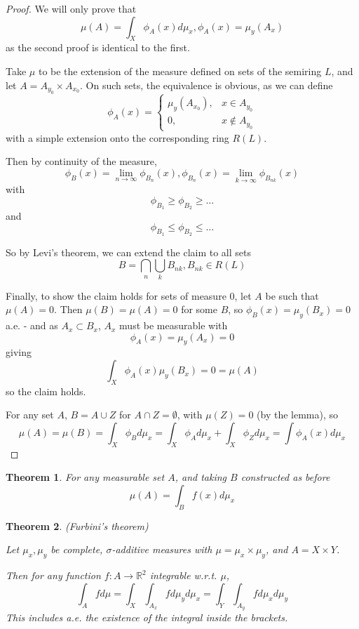 \documentclass[11pt,a4paper]{report}
\theoremstyle{plain}
\newtheorem{thm}{Theorem}[section]
\theoremstyle{definition}
\theoremstyle{remark}
\newcommand{\union}{\cup}
\newcommand{\intersection}{\cap}
\newcommand{\Union}{\bigcup}
\newcommand{\Intersection}{\bigcap}
\newcommand{\R}{\mathbb{R}}
\begin{document}
\begin{proof}
  We will only prove that
  $$ \mu(A) = \int_X \phi_A(x) d\mu_x, \phi_A(x) = \mu_y(A_x) $$
  as the second proof is identical to the first.

  Take $\mu$ to be the extension of the measure defined on sets of the semiring $L$, and let $A = A_{y_0} \times A_{x_0}$. On such sets, the equivalence is obvious, as we can define
    $$ \phi_A(x) = \begin{cases}
        \mu_y(A_{x_0}), & x \in A_{y_0} \\ 
        0, & x \not \in A_{y_0}
      \end{cases} $$
  with a simple extension onto the corresponding ring $R(L)$.

    Then by continuity of the measure, 
    $$\phi_B(x) = \lim_{n \rightarrow \infty} \phi_{B_n}(x), \phi_{B_n}(x) = \lim_{k \rightarrow \infty} \phi_{B_{nk}}(x)$$
    with
    $$ \phi_{B_1} \ge \phi_{B_2} \ge \dots $$
    and
    $$ \phi_{B_1} \le \phi_{B_2} \le \dots $$

    So by Levi's theorem, we can extend the claim to all sets
    $$ B = \Intersection_n \Union_k B_{nk}, B_{nk} \in R(L) $$

    Finally, to show the claim holds for sets of measure 0, let $A$ be such that $\mu(A) = 0$. Then $\mu(B) = \mu(A) = 0$ for some $B$, so $ \phi_B(x) = \mu_y(B_x) = 0 $ a.e. - and as $A_x \subset B_x$, $A_x$ must be measurable with
    $$ \phi_A(x) = \mu_y(A_x) = 0 $$
    giving
    $$ \int_X \phi_A(x)\mu_y(B_x) = 0 = \mu(A) $$
    so the claim holds.

    For any set $A$, $B = A \union Z$ for $A \intersection Z = \emptyset$, with $\mu(Z) = 0$ (by the lemma), so
    $$ \mu(A) = \mu(B) = \int_X \phi_B d\mu_x  = \int_X \phi_A d\mu_x + \int_X \phi_Z d \mu_x = \int \phi_A(x) d\mu_x $$
\end{proof}


\begin{thm}
    For any measurable set $A$, and taking $B$ constructed as before
    $$ \mu(A) = \int_B f(x) d \mu_x $$
\end{thm}

\begin{thm}(Furbini's theorem)

    Let $\mu_x, \mu_y$ be complete, $\sigma$-additive measures with $\mu = \mu_x \times \mu_y$, and $A = X \times Y$.

    Then for any function $f : A \rightarrow \R^2$ integrable w.r.t. $\mu$,
    $$ \int_A f d\mu = \int_X \int_{A_x} f d\mu_y d\mu_x = \int_Y \int_{A_y} f d\mu_x d\mu_y $$
  This includes a.e. the existence of the integral inside the brackets.
\end{thm}
\end{document}
